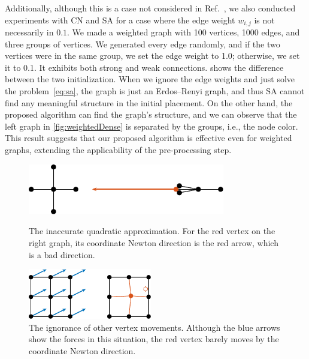\documentclass[dvipdfmx,10pt,journal,compsoc]{IEEEtran}
\begin{document}
Additionally, although this is a case not considered in Ref.~\cite{ghassemitoosiSimulatedAnnealingPreProcessing2016}, we also conducted experiments with \textsf{CN} and \textsf{SA} for a case where the edge weight $w_{i,j}$ is not necessarily in $\qty{0,1}$.
We made a weighted graph with 100 vertices, 1000 edges, and three groups of vertices.
We generated every edge randomly, and if the two vertices were in the same group, we set the edge weight to 1.0; otherwise, we set it to 0.1. It exhibits both strong and weak connections.
 shows the difference between the two initialization.
When we ignore the edge weights and just solve the problem~\eqref{eq:sa}, the graph is just an Erdos--Renyi graph, and thus \textsf{SA} cannot find any meaningful structure in the initial placement.
On the other hand, the proposed algorithm can find the graph's structure, and we can observe that the left graph in \cref{fig:weightedDense} is separated by the groups, i.e., the node color.
This result suggests that our proposed algorithm is effective even for weighted graphs, extending the applicability of the pre-processing step.

\begin{figure}[t]
  \centering
  \begin{minipage}{\columnwidth}
    \centering
    \includegraphics[height=2.2cm]{whyRSNfail/whyRSNfail.pdf}
    \caption{
      The inaccurate quadratic approximation.
      For the red vertex on the right graph, its coordinate Newton direction is the red arrow, which is a bad direction.
    }
    \label{fig:whyRSNfail}
  \end{minipage}
  \begin{minipage}{\columnwidth}
    \centering
    \includegraphics[height=2.2cm]{whyRSNfail2/whyRSNfail2.pdf}
    \caption{
      The ignorance of other vertex movements.
      Although the blue arrows show the forces in this situation, the red vertex barely moves by the coordinate Newton direction.
    }
    \label{fig:whyRSNfail2}
  \end{minipage}
\end{figure}
\end{document}
